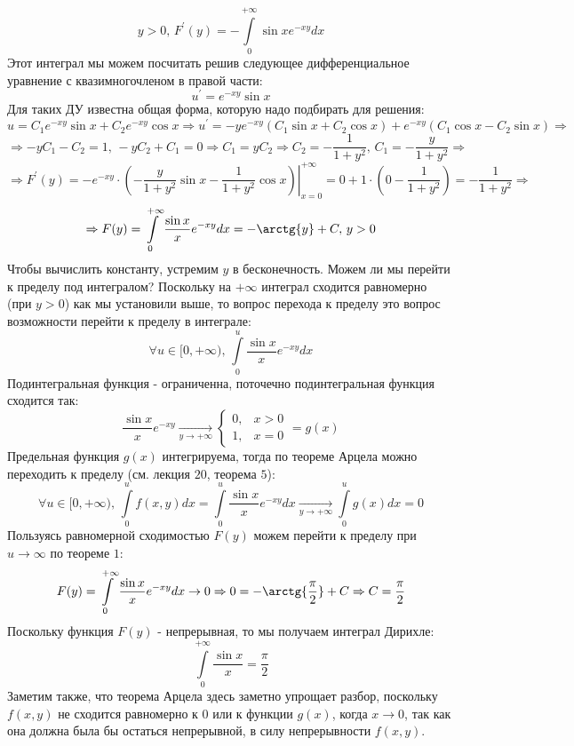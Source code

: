 \documentclass[12pt]{article}
\theoremstyle{definition}
\newcommand{\ddint}[2]{\displaystyle\int\limits_{#1}^{#2}}
\begin{document}
$$
	y > 0, \, F^\prime(y) = -\ddint{0}{+\infty}\sin{x}e^{-xy}dx
$$
Этот интеграл мы можем посчитать решив следующее дифференциальное уравнение с квазимногочленом в правой части:
$$
	u^\prime = e^{-xy}\sin{x}
$$
Для таких ДУ известна общая форма, которую надо подбирать для решения:
$$
	u = C_1 e^{-xy}\sin{x} + C_2 e^{-xy}\cos{x} \Rightarrow u^\prime = -ye^{-xy}\left(C_1 \sin{x} + C_2 \cos{x}\right) + e^{-xy}\left(C_1 \cos{x} - C_2 \sin{x}\right) \Rightarrow
$$
$$
	\Rightarrow -yC_1 -C_2 = 1, \, -yC_2 + C_1 = 0 \Rightarrow C_1 = yC_2 \Rightarrow C_2 = -\dfrac{1}{1 + y^2}, \, C_1 = - \dfrac{y}{1 + y^2} \Rightarrow
$$
$$
	\Rightarrow F^\prime(y) = - e^{-xy}{\cdot}\left.\left(-\dfrac{y}{1+y^2}\sin{x} - \dfrac{1}{1+ y^2}\cos{x}\right)\right|_{x = 0}^{+\infty} = 0 + 1{\cdot}\left(0 -\dfrac{1}{1+y^2}\right) = -\dfrac{1}{1+y^2} \Rightarrow
$$
$$
	\Rightarrow F(y) = \ddint{0}{+\infty}\dfrac{\sin{x}}{x}e^{-xy}dx =  -\arctg{y} + C, \, y > 0
$$
Чтобы вычислить константу, устремим $y$ в бесконечность. Можем ли мы перейти к пределу под интегралом? Поскольку на $+\infty$ интеграл сходится равномерно (при $y > 0$) как мы установили выше, то вопрос перехода к пределу это вопрос возможности перейти к пределу в интеграле:
$$
	\forall u \in [0, +\infty), \, \ddint{0}{u}\dfrac{\sin{x}}{x}e^{-xy}dx
$$
Подинтегральная функция - ограниченна, поточечно подинтегральная функция сходится так:
$$
	\dfrac{\sin{x}}{x}e^{-xy} \xrightarrow[y \to +\infty]{} \left\{
	\begin{array}{ll}
		0, 	& x >0 \\
		1, & x = 0
	\end{array}\right. = g(x)
$$
Предельная функция $g(x)$ интегрируема, тогда по теореме Арцела можно переходить к пределу (см. лекция $20$, теорема $5$):
$$
	\forall u \in [0, +\infty), \, \ddint{0}{u}f(x,y)dx = \ddint{0}{u}\dfrac{\sin{x}}{x}e^{-xy}dx \xrightarrow[y \to +\infty]{}\ddint{0}{u}g(x)dx = 0
$$
Пользуясь равномерной сходимостью $F(y)$ можем перейти к пределу при $u \to \infty$ по теореме $1$: 
$$
	F(y) = \ddint{0}{+\infty}\dfrac{\sin{x}}{x}e^{-xy}dx \to 0 \Rightarrow 0 = -\arctg{\dfrac{\pi}{2}} + C \Rightarrow C = \dfrac{\pi}{2}
$$
Поскольку функция $F(y)$ - непрерывная, то мы получаем интеграл Дирихле:
$$
	\ddint{0}{+\infty}\dfrac{\sin{x}}{x} = \dfrac{\pi}{2}
$$
Заметим также, что теорема Арцела здесь заметно упрощает разбор, поскольку $f(x,y)$ не сходится равномерно к $0$ или к функции $g(x)$, когда $x \to 0$, так как она должна была бы остаться непрерывной, в силу непрерывности $f(x,y)$.
\newpage
\end{document}
